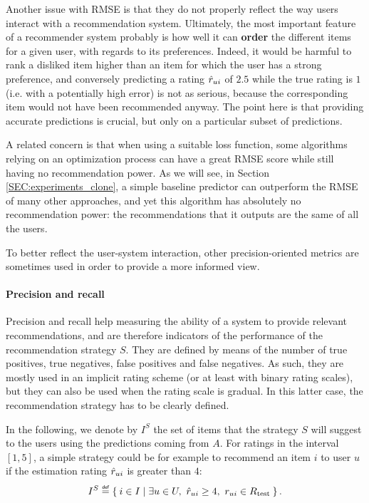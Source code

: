 Another issue with RMSE is that they do not properly reflect the way users
interact with a recommendation system.  Ultimately, the most important feature
of a recommender system probably is how well it can \textbf{order} the
different items for a given user, with regards to its preferences. Indeed, it
would be harmful to rank a disliked item higher than an item for which the user
has a strong preference, and conversely predicting a rating $\hat{r}_{ui}$ of $2.5$
while the true rating is $1$ (i.e. with a potentially high error) is not as
serious, because the corresponding item would not have been recommended anyway.
The point here is that providing accurate predictions is crucial, but only on a
particular subset of predictions.

A related concern is that when using a suitable loss function, some algorithms
relying on an optimization process
can have a great RMSE score while still having no recommendation power.
As we will see, in Section \ref{SEC:experiments_clone}, a simple baseline
predictor  can outperform the RMSE of many other approaches, and yet this
algorithm has absolutely no recommendation power: the recommendations that it
outputs are the same of all the users.

To better reflect the user-system interaction, other precision-oriented metrics
are sometimes used in order to provide a more informed view.

\paragraph{Precision and recall\\}
Precision and recall help measuring the ability of a system to provide relevant
recommendations, and are therefore indicators of the performance of the
recommendation strategy $S$. They are defined by means of the number of true
positives, true negatives, false positives and false negatives. As such, they
are mostly used in an implicit rating scheme (or at least with binary rating
scales), but they can also be used when the rating scale is gradual. In this
latter case, the recommendation strategy has to be clearly defined.

In the following, we denote by $I^S$ the set of items that the strategy $S$
will suggest to the users using the predictions coming from $A$. For
ratings in the interval $[1, 5]$, a simple strategy could be for example to
recommend an item $i$ to user $u$ if the estimation rating $\hat{r}_{ui}$ is
greater than $4$:
$$I^S \eqdef \Set{i \in I | \exists u \in U, ~\predrui \geq 4,~ \rui \in \Rtest}.$$

